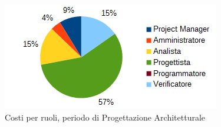 	\begin{figure}[H]
		\centering
		\includegraphics[width=1\linewidth]{immagini/grafici/progettazione_architetturale-torta-costo.png}
		\caption{Costi per ruoli, periodo di Progettazione Architetturale}
	\end{figure}
